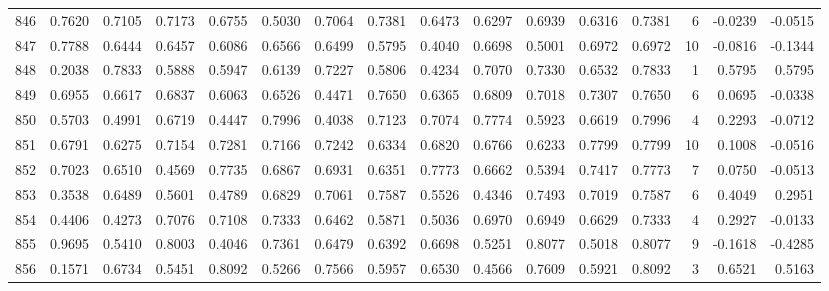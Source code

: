 \begin{tabular}{lrrrrrrrrrrrrrrr}
846 &      0.7620 &  0.7105 &  0.7173 &  0.6755 &  0.5030 &  0.7064 &  0.7381 &  0.6473 &  0.6297 &  0.6939 &   0.6316 &     0.7381 &      6 &                   -0.0239 &                    -0.0515 \\
847 &      0.7788 &  0.6444 &  0.6457 &  0.6086 &  0.6566 &  0.6499 &  0.5795 &  0.4040 &  0.6698 &  0.5001 &   0.6972 &     0.6972 &     10 &                   -0.0816 &                    -0.1344 \\
848 &      0.2038 &  0.7833 &  0.5888 &  0.5947 &  0.6139 &  0.7227 &  0.5806 &  0.4234 &  0.7070 &  0.7330 &   0.6532 &     0.7833 &      1 &                    0.5795 &                     0.5795 \\
849 &      0.6955 &  0.6617 &  0.6837 &  0.6063 &  0.6526 &  0.4471 &  0.7650 &  0.6365 &  0.6809 &  0.7018 &   0.7307 &     0.7650 &      6 &                    0.0695 &                    -0.0338 \\
850 &      0.5703 &  0.4991 &  0.6719 &  0.4447 &  0.7996 &  0.4038 &  0.7123 &  0.7074 &  0.7774 &  0.5923 &   0.6619 &     0.7996 &      4 &                    0.2293 &                    -0.0712 \\
851 &      0.6791 &  0.6275 &  0.7154 &  0.7281 &  0.7166 &  0.7242 &  0.6334 &  0.6820 &  0.6766 &  0.6233 &   0.7799 &     0.7799 &     10 &                    0.1008 &                    -0.0516 \\
852 &      0.7023 &  0.6510 &  0.4569 &  0.7735 &  0.6867 &  0.6931 &  0.6351 &  0.7773 &  0.6662 &  0.5394 &   0.7417 &     0.7773 &      7 &                    0.0750 &                    -0.0513 \\
853 &      0.3538 &  0.6489 &  0.5601 &  0.4789 &  0.6829 &  0.7061 &  0.7587 &  0.5526 &  0.4346 &  0.7493 &   0.7019 &     0.7587 &      6 &                    0.4049 &                     0.2951 \\
854 &      0.4406 &  0.4273 &  0.7076 &  0.7108 &  0.7333 &  0.6462 &  0.5871 &  0.5036 &  0.6970 &  0.6949 &   0.6629 &     0.7333 &      4 &                    0.2927 &                    -0.0133 \\
855 &      0.9695 &  0.5410 &  0.8003 &  0.4046 &  0.7361 &  0.6479 &  0.6392 &  0.6698 &  0.5251 &  0.8077 &   0.5018 &     0.8077 &      9 &                   -0.1618 &                    -0.4285 \\
856 &      0.1571 &  0.6734 &  0.5451 &  0.8092 &  0.5266 &  0.7566 &  0.5957 &  0.6530 &  0.4566 &  0.7609 &   0.5921 &     0.8092 &      3 &                    0.6521 &                     0.5163 \\

\end{tabular}
